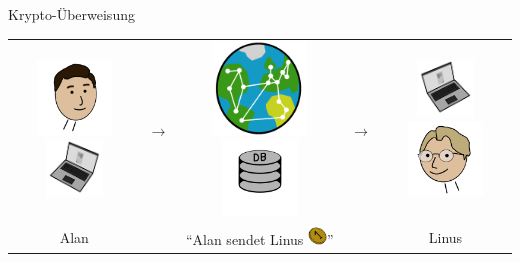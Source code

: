 \documentclass[aspectratio=169]{beamer}
\begin{document}
\begin{frame}{Krypto-Überweisung}
    \begin{center}
        \begin{tabular}{ccccc}
            \includegraphics[width=2cm]{../icons/Alan}\hspace*{-0.5cm}\includegraphics[width=1.5cm]{../icons/ComputerLeft} & {\Huge$\longrightarrow$} & \includegraphics[width=2.5cm]{../icons/Internet}\hspace*{-1.5cm}\includegraphics[width=2cm]{../icons/DB} & {\Huge$\longrightarrow$} & \includegraphics[width=1.5cm]{../icons/ComputerRight}\hspace*{-0.5cm}\includegraphics[width=2cm]{../icons/Linus}\\
            Alan & & ``Alan sendet Linus \includegraphics[width=0.5cm]{../icons/Coin}'' & & Linus\\
        \end{tabular}
    \end{center}
    \vspace{0.5cm}


\end{frame}
\end{document}

